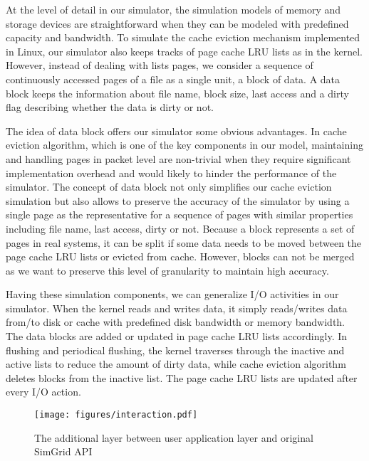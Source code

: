 \documentclass[conference]{IEEEtran}
\begin{document}
			At the level of detail in our simulator, the simulation models of memory 
			and storage devices are straightforward when they can be modeled with 
			predefined capacity and bandwidth. To simulate the cache eviction mechanism 
			implemented in Linux, our simulator also keeps tracks of page cache 
			LRU lists as in the kernel. However, instead of dealing with lists pages, we 
			consider a sequence of continuously accessed pages of a file as a single 
			unit, a block of data. A data block keeps the information about file name, 
			block size, last access and a dirty flag describing whether the data is 
			dirty or not. 
			
			The idea of data block offers our simulator some obvious advantages. 
			In cache eviction algorithm, which is one of the key components 
			in our model, maintaining and handling pages in packet level are 
			non-trivial when they require significant implementation overhead and 
			would likely to hinder the performance of the simulator. The concept of data 
			block not only simplifies our cache eviction simulation but also allows to 
			preserve the accuracy of the simulator by using a single page as the 
			representative for a sequence of pages with similar properties including 
			file name, last access, dirty or not. Because a block represents a set of 
			pages in real systems, it can be split if some data needs to be moved 
			between the page cache LRU lists or evicted from cache. However, blocks can 
			not be merged as we want to preserve this level of granularity to maintain 
			high accuracy.			 
			
			Having these simulation components, we can generalize I/O activities in
			our simulator. When the kernel reads and writes data, it simply 
			reads/writes data from/to disk or cache with predefined disk bandwidth 
			or memory bandwidth. The data blocks are added or updated in page cache 
			LRU lists accordingly. In flushing and periodical flushing, the kernel 
			traverses through the inactive and active lists to reduce the amount of 
			dirty data, while cache eviction algorithm deletes blocks from the 
			inactive list. The page cache LRU lists are updated after every I/O action.
			
			\begin{figure}
   				\centering
   				\texttt{[image: figures/interaction.pdf]}
   				\caption{The additional layer between user application layer and 
   				original SimGrid API}\label{fig:interaction}
			\end{figure}			
			
\end{document}
